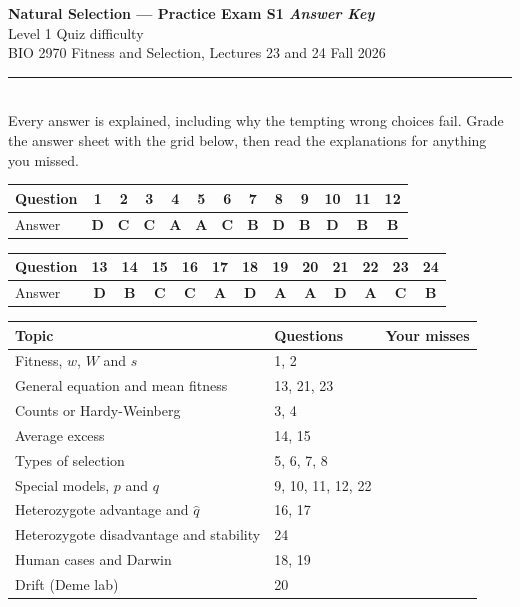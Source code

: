 \documentclass[11pt]{article}
\begin{document}
\begin{center}
  {\LARGE\bfseries Natural Selection --- Practice Exam S1 \textit{Answer Key}}\\[5pt]
  {\large Level 1 \quad\textbullet\quad Quiz difficulty}\\[6pt]
  BIO 2970 \quad\textbullet\quad Fitness and Selection, Lectures 23 and 24 \quad\textbullet\quad Fall 2026\\[3pt]
  \rule{\textwidth}{0.8pt}\\[3pt]
  {\small Every answer is explained, including why the tempting wrong choices fail. Grade the answer sheet with the grid below, then read the explanations for anything you missed.}
\end{center}
\vspace{0.4em}

\begin{center}\small\setlength{\tabcolsep}{6.2pt}\begin{tabular}{lcccccccccccc}
\toprule
Question & 1 & 2 & 3 & 4 & 5 & 6 & 7 & 8 & 9 & 10 & 11 & 12 \\
\midrule
Answer & \textbf{D} & \textbf{C} & \textbf{C} & \textbf{A} & \textbf{A} & \textbf{C} & \textbf{B} & \textbf{D} & \textbf{B} & \textbf{D} & \textbf{B} & \textbf{B} \\
\bottomrule\end{tabular}\end{center}
\begin{center}\small\setlength{\tabcolsep}{6.2pt}\begin{tabular}{lcccccccccccc}
\toprule
Question & 13 & 14 & 15 & 16 & 17 & 18 & 19 & 20 & 21 & 22 & 23 & 24 \\
\midrule
Answer & \textbf{D} & \textbf{B} & \textbf{C} & \textbf{C} & \textbf{A} & \textbf{D} & \textbf{A} & \textbf{A} & \textbf{D} & \textbf{A} & \textbf{C} & \textbf{B} \\
\bottomrule\end{tabular}\end{center}
\begin{center}\small\begin{tabular}{lll}\toprule Topic & Questions & Your misses\\\midrule
Fitness, \(w\), \(W\) and \(s\) & 1, 2 & \\
General equation and mean fitness & 13, 21, 23 & \\
Counts or Hardy-Weinberg & 3, 4 & \\
Average excess & 14, 15 & \\
Types of selection & 5, 6, 7, 8 & \\
Special models, \(p\) and \(q\) & 9, 10, 11, 12, 22 & \\
Heterozygote advantage and \(\hat{q}\) & 16, 17 & \\
Heterozygote disadvantage and stability & 24 & \\
Human cases and Darwin & 18, 19 & \\
Drift (Deme lab) & 20 & \\
\bottomrule\end{tabular}\end{center}
\end{document}
